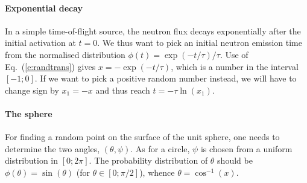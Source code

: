 \paragraph{Exponential decay}
In a simple time-of-flight source, the neutron flux decays exponentially
after the initial activation at $t=0$. We thus want to pick an initial
neutron emission time from the normalised distribution 
$\phi(t) = \exp(-t/\tau) / \tau$.
Use of Eq.~(\ref{e:randtrans}) gives
$x = - \exp(-t/\tau)$, which is a number in the interval $[-1; 0]$.
If we want to pick a positive random number instead, we will have 
to change sign by $x_1 = -x$ and thus reach $t = - \tau \ln (x_1)$. 


\paragraph{The sphere}
For finding a random point on the surface of the unit sphere, 
one needs to determine the two angles, $(\theta, \psi)$. 
As for a circle, $\psi$ is chosen from a uniform distribution
in $[0; 2\pi]$. The probability distribution of $\theta$ should be
$\phi(\theta)=\sin(\theta)$ (for $\theta \in [0; \pi/2 ]$), 
whence $\theta=\cos^{-1}(x)$.
